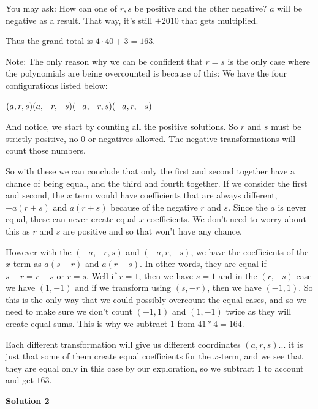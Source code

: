 \begin{enumerate}
 You may ask: How can one of ${r, s}$ be positive and the other negative? $a$ will be negative as a result. That way, it's still $+2010$ that gets multiplied.

 Thus the grand total is $4\cdot40 + 3 = \boxed{163}$.

 Note: The only reason why we can be confident that $r = s$ is the only case where the polynomials are being overcounted is because of this: We have the four configurations listed below:

 $(a,r,s)\\ (a,-r,-s)\\ (-a,-r,s)\\ (-a,r,-s)$

 And notice, we start by counting all the positive solutions. So $r$ and $s$ must be strictly positive, no $0$ or negatives allowed. The negative transformations will count those numbers.

 So with these we can conclude that only the first and second together have a chance of being equal, and the third and fourth together. If we consider the first and second, the $x$ term would have coefficients that are always different, $-a(r + s)$ and $a(r + s)$ because of the negative $r$ and $s$. Since the $a$ is never equal, these can never create equal $x$ coefficients. We don't need to worry about this as $r$ and $s$ are positive and so that won't have any chance.

 However with the $(-a,-r,s)$ and $(-a,r,-s)$, we have the coefficients of the $x$ term as $a(s-r)$ and $a(r-s)$. In other words, they are equal if $s-r=r-s$ or $r=s$. Well if $r = 1$, then we have $s = 1$ and in the $(r,-s)$ case we have $(1,-1)$ and if we transform using $(s,-r)$, then we have $(-1, 1)$. So this is the only way that we could possibly overcount the equal cases, and so we need to make sure we don't count $(-1,1)$ and $(1,-1)$ twice as they will create equal sums. This is why we subtract $1$ from $41*4=164$.

 Each different transformation will give us different coordinates $(a,r,s)...$ it is just that some of them create equal coefficients for the $x$-term, and we see that they are equal only in this case by our exploration, so we subtract $1$ to account and get $163$.

 



\textbf{Solution 2}


\end{enumerate}
